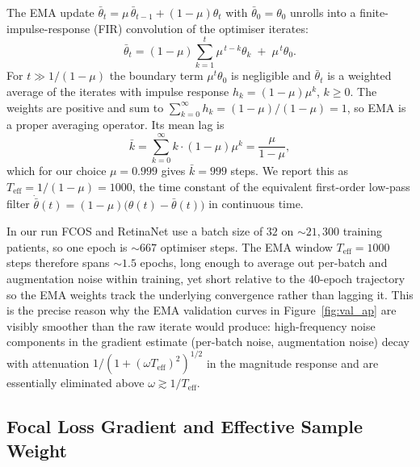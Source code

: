 \documentclass[11pt,a4paper]{article}
\begin{document}
The EMA update $\bar\theta_t = \mu\,\bar\theta_{t-1} + (1 - \mu)\theta_t$ with $\bar\theta_0 = \theta_0$ unrolls into a finite-impulse-response (FIR) convolution of the optimiser iterates:
\begin{equation}
\bar\theta_t = (1 - \mu)\sum_{k=1}^{t} \mu^{\,t - k}\theta_k \;+\; \mu^{\,t}\theta_0.
\end{equation}
For $t \gg 1/(1-\mu)$ the boundary term $\mu^t \theta_0$ is negligible and $\bar\theta_t$ is a weighted average of the iterates with impulse response $h_k = (1 - \mu)\mu^{k}$, $k \geq 0$. The weights are positive and sum to $\sum_{k=0}^\infty h_k = (1 - \mu)/(1 - \mu) = 1$, so EMA is a proper averaging operator. Its mean lag is
\begin{equation}
\bar k = \sum_{k=0}^{\infty} k \cdot (1-\mu)\mu^{k} = \frac{\mu}{1 - \mu},
\end{equation}
which for our choice $\mu = 0.999$ gives $\bar k = 999$ steps. We report this as $T_{\mathrm{eff}} = 1/(1 - \mu) = 1000$, the time constant of the equivalent first-order low-pass filter $\dot{\bar\theta}(t) = (1 - \mu)\bigl(\theta(t) - \bar\theta(t)\bigr)$ in continuous time.

In our run FCOS and RetinaNet use a batch size of $32$ on $\sim 21{,}300$ training patients, so one epoch is $\sim 667$ optimiser steps. The EMA window $T_{\mathrm{eff}} = 1000$ steps therefore spans $\sim 1.5$ epochs, long enough to average out per-batch and augmentation noise within training, yet short relative to the $40$-epoch trajectory so the EMA weights track the underlying convergence rather than lagging it. This is the precise reason why the EMA validation curves in Figure~\ref{fig:val_ap} are visibly smoother than the raw iterate would produce: high-frequency noise components in the gradient estimate (per-batch noise, augmentation noise) decay with attenuation $1/(1 + (\omega T_{\mathrm{eff}})^2)^{1/2}$ in the magnitude response and are essentially eliminated above $\omega \gtrsim 1/T_{\mathrm{eff}}$.

\subsection{Focal Loss Gradient and Effective Sample Weight}
\label{sec:numerical-focal}
\end{document}
